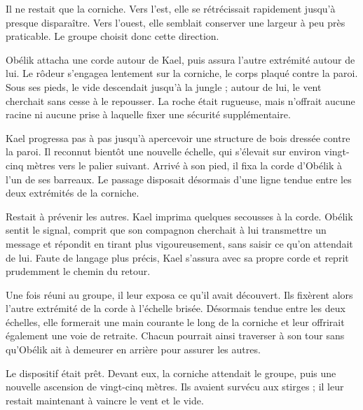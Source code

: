 Il ne restait que la corniche. Vers l'est, elle se rétrécissait rapidement jusqu'à presque disparaître. Vers l'ouest, elle semblait conserver une largeur à peu près praticable. Le groupe choisit donc cette direction.

Obélik attacha une corde autour de Kael, puis assura l'autre extrémité autour de lui. Le rôdeur s'engagea lentement sur la corniche, le corps plaqué contre la paroi. Sous ses pieds, le vide descendait jusqu'à la jungle ; autour de lui, le vent cherchait sans cesse à le repousser. La roche était rugueuse, mais n'offrait aucune racine ni aucune prise à laquelle fixer une sécurité supplémentaire.

Kael progressa pas à pas jusqu'à apercevoir une structure de bois dressée contre la paroi. Il reconnut bientôt une nouvelle échelle, qui s'élevait sur environ vingt-cinq mètres vers le palier suivant. Arrivé à son pied, il fixa la corde d'Obélik à l'un de ses barreaux. Le passage disposait désormais d'une ligne tendue entre les deux extrémités de la corniche.

Restait à prévenir les autres. Kael imprima quelques secousses à la corde. Obélik sentit le signal, comprit que son compagnon cherchait à lui transmettre un message et répondit en tirant plus vigoureusement, sans saisir ce qu'on attendait de lui. Faute de langage plus précis, Kael s'assura avec sa propre corde et reprit prudemment le chemin du retour.

Une fois réuni au groupe, il leur exposa ce qu'il avait découvert. Ils fixèrent alors l'autre extrémité de la corde à l'échelle brisée. Désormais tendue entre les deux échelles, elle formerait une main courante le long de la corniche et leur offrirait également une voie de retraite. Chacun pourrait ainsi traverser à son tour sans qu'Obélik ait à demeurer en arrière pour assurer les autres.

Le dispositif était prêt. Devant eux, la corniche attendait le groupe, puis une nouvelle ascension de vingt-cinq mètres. Ils avaient survécu aux stirges ; il leur restait maintenant à vaincre le vent et le vide.
